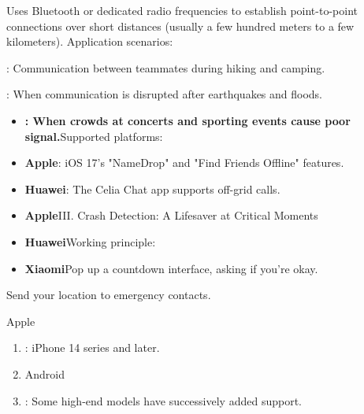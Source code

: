 \begin{tcbinfo}{Uses Bluetooth or dedicated radio frequencies to establish point-to-point connections over short distances (usually a few hundred meters to a few kilometers).}
Application scenarios:

\end{tcbinfo}


: Communication between teammates during hiking and camping.


: When communication is disrupted after earthquakes and floods.


\begin{itemize}
  \item \textbf{: When crowds at concerts and sporting events cause poor signal.}Supported platforms:
  \item \textbf{Apple}: iOS 17's "NameDrop" and "Find Friends Offline" features.
  \item \textbf{Huawei}: The Celia Chat app supports off-grid calls.
\end{itemize}


\begin{itemize}
  \item \textbf{Apple}III. Crash Detection: A Lifesaver at Critical Moments
  \item \textbf{Huawei}Working principle:
  \item \textbf{Xiaomi}Pop up a countdown interface, asking if you're okay.
\end{itemize}


Send your location to emergency contacts.


Apple

\begin{enumerate}
  \item : iPhone 14 series and later.
  \item Android
  \item : Some high-end models have successively added support.
\end{enumerate}


